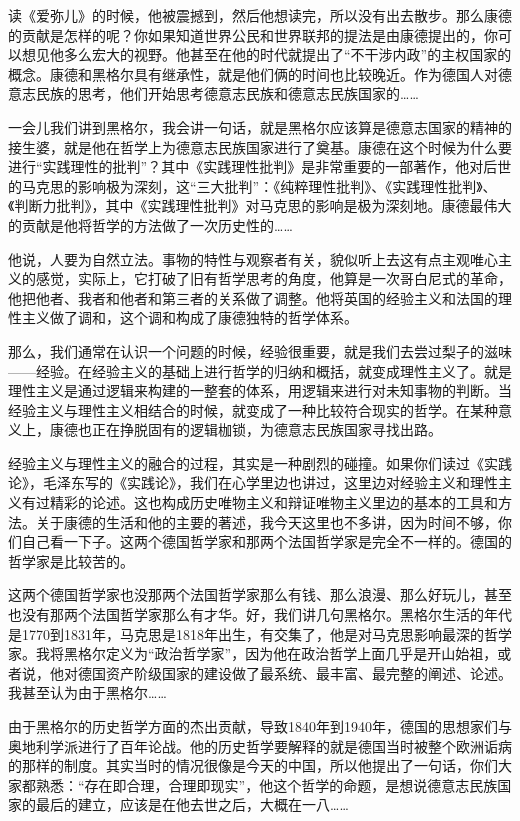 \documentclass[UTF8, 12pt, a4paper]{ctexrep}
\begin{document}
读《爱弥儿》的时候，他被震撼到，然后他想读完，所以没有出去散步。那么康德的贡献是怎样的呢？你如果知道世界公民和世界联邦的提法是由康德提出的，你可以想见他多么宏大的视野。他甚至在他的时代就提出了“不干涉内政”的主权国家的概念。康德和黑格尔具有继承性，就是他们俩的时间也比较晚近。作为德国人对德意志民族的思考，他们开始思考德意志民族和德意志民族国家的……

一会儿我们讲到黑格尔，我会讲一句话，就是黑格尔应该算是德意志国家的精神的接生婆，就是他在哲学上为德意志民族国家进行了奠基。康德在这个时候为什么要进行“实践理性的批判”？其中《实践理性批判》是非常重要的一部著作，他对后世的马克思的影响极为深刻，这“三大批判”：《纯粹理性批判》、《实践理性批判》、《判断力批判》，其中《实践理性批判》对马克思的影响是极为深刻地。康德最伟大的贡献是他将哲学的方法做了一次历史性的……

他说，人要为自然立法。事物的特性与观察者有关，貌似听上去这有点主观唯心主义的感觉，实际上，它打破了旧有哲学思考的角度，他算是一次哥白尼式的革命，他把他者、我者和他者和第三者的关系做了调整。他将英国的经验主义和法国的理性主义做了调和，这个调和构成了康德独特的哲学体系。

那么，我们通常在认识一个问题的时候，经验很重要，就是我们去尝过梨子的滋味——经验。在经验主义的基础上进行哲学的归纳和概括，就变成理性主义了。就是理性主义是通过逻辑来构建的一整套的体系，用逻辑来进行对未知事物的判断。当经验主义与理性主义相结合的时候，就变成了一种比较符合现实的哲学。在某种意义上，康德也正在挣脱固有的逻辑枷锁，为德意志民族国家寻找出路。

经验主义与理性主义的融合的过程，其实是一种剧烈的碰撞。如果你们读过《实践论》，毛泽东写的《实践论》，我们在心学里边也讲过，这里边对经验主义和理性主义有过精彩的论述。这也构成历史唯物主义和辩证唯物主义里边的基本的工具和方法。关于康德的生活和他的主要的著述，我今天这里也不多讲，因为时间不够，你们自己看一下子。这两个德国哲学家和那两个法国哲学家是完全不一样的。德国的哲学家是比较苦的。

这两个德国哲学家也没那两个法国哲学家那么有钱、那么浪漫、那么好玩儿，甚至也没有那两个法国哲学家那么有才华。好，我们讲几句黑格尔。黑格尔生活的年代是1770到1831年，马克思是1818年出生，有交集了，他是对马克思影响最深的哲学家。我将黑格尔定义为“政治哲学家”，因为他在政治哲学上面几乎是开山始祖，或者说，他对德国资产阶级国家的建设做了最系统、最丰富、最完整的阐述、论述。我甚至认为由于黑格尔……

由于黑格尔的历史哲学方面的杰出贡献，导致1840年到1940年，德国的思想家们与奥地利学派进行了百年论战。他的历史哲学要解释的就是德国当时被整个欧洲诟病的那样的制度。其实当时的情况很像是今天的中国，所以他提出了一句话，你们大家都熟悉：“存在即合理，合理即现实”，他这个哲学的命题，是想说德意志民族国家的最后的建立，应该是在他去世之后，大概在一八……
\end{document}
